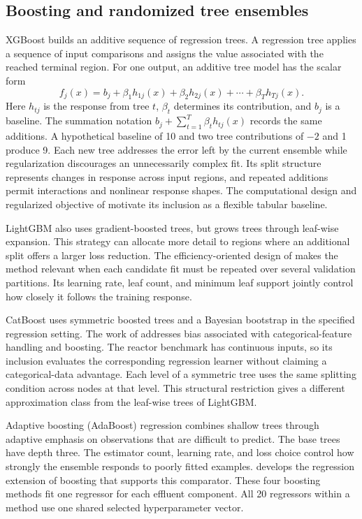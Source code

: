 \subsection{Boosting and randomized tree ensembles}

XGBoost builds an additive sequence of regression trees. A regression tree applies a sequence of input comparisons and assigns the value associated with the reached terminal region. For one output, an additive tree model has the scalar form
\[
f_j(x)=b_j+\beta_1h_{1j}(x)+\beta_2h_{2j}(x)+\cdots+\beta_Th_{Tj}(x).
\]
Here $h_{tj}$ is the response from tree $t$, $\beta_t$ determines its contribution, and $b_j$ is a baseline. The summation notation $b_j+\sum_{t=1}^T\beta_th_{tj}(x)$ records the same additions. A hypothetical baseline of 10 and two tree contributions of $-2$ and 1 produce 9. Each new tree addresses the error left by the current ensemble while regularization discourages an unnecessarily complex fit. Its split structure represents changes in response across input regions, and repeated additions permit interactions and nonlinear response shapes. The computational design and regularized objective of \citet{ChenGuestrin2016} motivate its inclusion as a flexible tabular baseline.

LightGBM also uses gradient-boosted trees, but grows trees through leaf-wise expansion. This strategy can allocate more detail to regions where an additional split offers a larger loss reduction. The efficiency-oriented design of \citet{Ke2017} makes the method relevant when each candidate fit must be repeated over several validation partitions. Its learning rate, leaf count, and minimum leaf support jointly control how closely it follows the training response.

CatBoost uses symmetric boosted trees and a Bayesian bootstrap in the specified regression setting. The work of \citet{Prokhorenkova2018} addresses bias associated with categorical-feature handling and boosting. The reactor benchmark has continuous inputs, so its inclusion evaluates the corresponding regression learner without claiming a categorical-data advantage. Each level of a symmetric tree uses the same splitting condition across nodes at that level. This structural restriction gives a different approximation class from the leaf-wise trees of LightGBM.

Adaptive boosting (AdaBoost) regression combines shallow trees through adaptive emphasis on observations that are difficult to predict. The base trees have depth three. The estimator count, learning rate, and loss choice control how strongly the ensemble responds to poorly fitted examples. \citet{Drucker1997} develops the regression extension of boosting that supports this comparator. These four boosting methods fit one regressor for each effluent component. All 20 regressors within a method use one shared selected hyperparameter vector.

